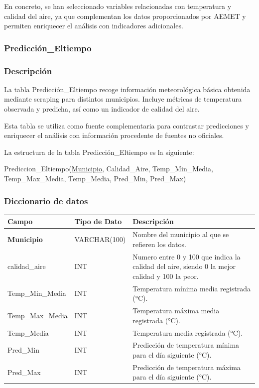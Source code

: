 \documentclass[12pt, a4paper]{article}
\begin{document}
En concreto, se han seleccionado variables relacionadas con temperatura y calidad del aire, ya que complementan los datos proporcionados por AEMET y permiten enriquecer el análisis con indicadores adicionales.

\subsubsection{Predicción\_Eltiempo}
\subsubsection*{Descripción}
La tabla Predicción\_Eltiempo recoge información meteorológica básica obtenida mediante scraping para distintos municipios. 
Incluye métricas de temperatura observada y predicha, así como un indicador de calidad del aire.

Esta tabla se utiliza como fuente complementaria para contrastar predicciones y enriquecer el análisis con información procedente de fuentes no oficiales.

La estructura de la tabla Predicción\_Eltiempo es la siguiente:

Prediccion\_Eltiempo(\underline{Municipio}, Calidad\_Aire, Temp\_Min\_Media, Temp\_Max\_Media, Temp\_Media, Pred\_Min, Pred\_Max)

\subsubsection*{Diccionario de datos}
\begin{center}
\begin{tabular}{|p{}|p{}|p{}|}
\hline
\textbf{Campo} & \textbf{Tipo de Dato} & \textbf{Descripción} \\
\hline
\textbf{Municipio} & VARCHAR(100) & Nombre del municipio al que se refieren los datos. \\
calidad\_aire & INT & Numero entre 0 y 100 que indica la calidad del aire, siendo 0 la mejor calidad y 100 la peor. \\
Temp\_Min\_Media & INT & Temperatura mínima media registrada (°C). \\
Temp\_Max\_Media & INT & Temperatura máxima media registrada (°C). \\
Temp\_Media & INT & Temperatura media registrada (°C). \\
Pred\_Min & INT & Predicción de temperatura mínima para el día siguiente (°C). \\
Pred\_Max & INT & Predicción de temperatura máxima para el día siguiente (°C). \\
\hline
\end{tabular}
\end{center}
\end{document}
